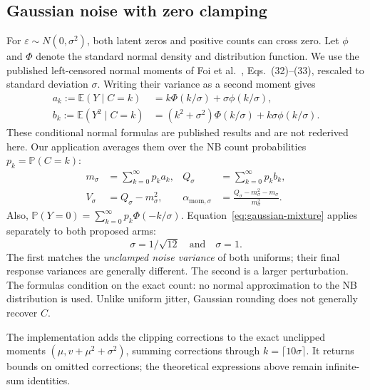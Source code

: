 \documentclass[11pt]{article}
\newcommand{\E}{\mathbb{E}}
\newcommand{\Prob}{\mathbb{P}}
\begin{document}
\subsection{Gaussian noise with zero clamping}
For $\varepsilon\sim N(0,\sigma^2)$, both latent zeros and positive counts
can cross zero. Let $\phi$ and $\Phi$ denote the standard normal density
and distribution function. We use the published left-censored normal
moments of Foi et al.~\cite{foi2008}, Eqs.~(32)--(33), rescaled to
standard deviation $\sigma$. Writing their variance as a second moment gives
\begin{align}
  a_k:=\E(Y\mid C=k)
     &=k\Phi(k/\sigma)+\sigma\phi(k/\sigma),\\
  b_k:=\E(Y^2\mid C=k)
     &=(k^2+\sigma^2)\Phi(k/\sigma)
          +k\sigma\phi(k/\sigma).
\end{align}
These conditional normal formulas are published results and are not
rederived here. Our application averages them over the NB count
probabilities $p_k=\Prob(C=k)$:
\begin{align}
  m_\sigma &=\sum_{k=0}^{\infty}p_k a_k, &
  Q_\sigma&=\sum_{k=0}^{\infty}p_k b_k,\\
  V_\sigma&=Q_\sigma-m_\sigma^2, &
  \alpha_{\mathrm{mom},\sigma}
    &=\frac{Q_\sigma-m_\sigma^2-m_\sigma}{m_\sigma^2}.
  \label{eq:gaussian-mixture}
\end{align}
Also, $\Prob(Y=0)=\sum_{k=0}^{\infty}p_k\Phi(-k/\sigma)$.
Equation~\eqref{eq:gaussian-mixture} applies separately to both proposed arms:
\begin{equation}
  \sigma=1/\sqrt{12}\quad\text{and}\quad\sigma=1.
\end{equation}
The first matches the \emph{unclamped noise variance} of both uniforms;
their final response variances are generally different. The second is a
larger perturbation. The formulas condition on the exact count: no normal
approximation to the NB distribution is used. Unlike uniform jitter,
Gaussian rounding does not generally recover $C$.

The implementation adds the clipping corrections to the exact unclipped
moments $(\mu,v+\mu^2+\sigma^2)$, summing corrections through
$k=\lceil10\sigma\rceil$. It returns bounds on omitted corrections;
the theoretical expressions above remain infinite-sum identities.
\end{document}
